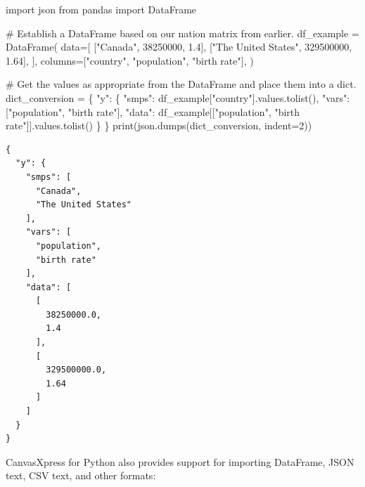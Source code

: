 \documentclass[
  letterpaper,
  DIV=11,
  numbers=noendperiod]{scrartcl}
\newenvironment{Shaded}{\begin{snugshade}}{\end{snugshade}}
\newcommand{\BuiltInTok}[1]{\textcolor[rgb]{0.00,0.23,0.31}{#1}}
\newcommand{\CommentTok}[1]{\textcolor[rgb]{0.37,0.37,0.37}{#1}}
\newcommand{\DecValTok}[1]{\textcolor[rgb]{0.68,0.00,0.00}{#1}}
\newcommand{\FloatTok}[1]{\textcolor[rgb]{0.68,0.00,0.00}{#1}}
\newcommand{\ImportTok}[1]{\textcolor[rgb]{0.00,0.46,0.62}{#1}}
\newcommand{\NormalTok}[1]{\textcolor[rgb]{0.00,0.23,0.31}{#1}}
\newcommand{\OperatorTok}[1]{\textcolor[rgb]{0.37,0.37,0.37}{#1}}
\newcommand{\StringTok}[1]{\textcolor[rgb]{0.13,0.47,0.30}{#1}}
\begin{document}
\begin{Shaded}
\begin{Highlighting}[]
\ImportTok{import}\NormalTok{ json}
\ImportTok{from}\NormalTok{ pandas }\ImportTok{import}\NormalTok{ DataFrame}

\CommentTok{\# Establish a DataFrame based on our nation matrix from earlier.}
\NormalTok{df\_example }\OperatorTok{=}\NormalTok{ DataFrame(}
\NormalTok{  data}\OperatorTok{=}\NormalTok{[}
\NormalTok{    [}\StringTok{"Canada"}\NormalTok{, }\DecValTok{38250000}\NormalTok{, }\FloatTok{1.4}\NormalTok{],}
\NormalTok{    [}\StringTok{"The United States"}\NormalTok{, }\DecValTok{329500000}\NormalTok{, }\FloatTok{1.64}\NormalTok{],}
\NormalTok{  ],}
\NormalTok{  columns}\OperatorTok{=}\NormalTok{[}\StringTok{"country"}\NormalTok{, }\StringTok{"population"}\NormalTok{, }\StringTok{"birth rate"}\NormalTok{],}
\NormalTok{)}

\CommentTok{\# Get the values as appropriate from the DataFrame and place them into a dict.}
\NormalTok{dict\_conversion }\OperatorTok{=}\NormalTok{ \{}
  \StringTok{"y"}\NormalTok{: \{}
    \StringTok{"smps"}\NormalTok{: df\_example[}\StringTok{"country"}\NormalTok{].values.tolist(),}
    \StringTok{"vars"}\NormalTok{: [}\StringTok{"population"}\NormalTok{, }\StringTok{"birth rate"}\NormalTok{],}
    \StringTok{"data"}\NormalTok{: df\_example[[}\StringTok{"population"}\NormalTok{, }\StringTok{"birth rate"}\NormalTok{]].values.tolist()}
\NormalTok{  \}}
\NormalTok{\}}
\BuiltInTok{print}\NormalTok{(json.dumps(dict\_conversion, indent}\OperatorTok{=}\DecValTok{2}\NormalTok{))}
\end{Highlighting}
\end{Shaded}

\begin{verbatim}
{
  "y": {
    "smps": [
      "Canada",
      "The United States"
    ],
    "vars": [
      "population",
      "birth rate"
    ],
    "data": [
      [
        38250000.0,
        1.4
      ],
      [
        329500000.0,
        1.64
      ]
    ]
  }
}
\end{verbatim}

CanvasXpress for Python also provides support for importing DataFrame,
JSON text, CSV text, and other formats:
\end{document}
